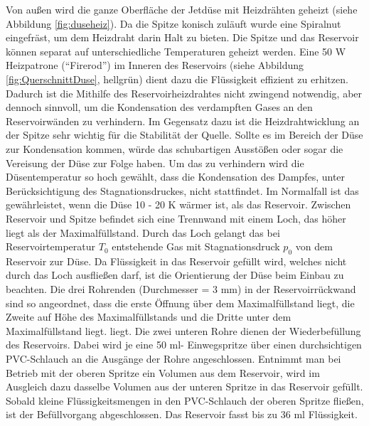 Von außen wird die ganze Oberfläche der Jetdüse mit Heizdrähten geheizt \linebreak (siehe Abbildung \ref{fig:duseheiz}). Da die Spitze konisch zuläuft wurde eine Spiralnut eingefräst, um dem Heizdraht darin Halt zu bieten. Die Spitze und das Reservoir können separat auf unterschiedliche Temperaturen geheizt werden. Eine 50 W Heizpatrone \linebreak (\enquote{Firerod}) im Inneren des Reservoirs (siehe Abbildung \ref{fig:QuerschnittDuse}, hellgrün) dient dazu die Flüssigkeit effizient zu erhitzen. Dadurch ist die Mithilfe des Reservoirheizdrahtes nicht zwingend notwendig, aber dennoch sinnvoll, um die Kondensation des verdampften Gases an den Reservoirwänden zu verhindern. Im Gegensatz dazu ist die Heizdrahtwicklung an der Spitze sehr wichtig für die Stabilität der Quelle. Sollte es im Bereich der Düse zur Kondensation kommen, würde das schubartigen Ausstößen oder sogar die Vereisung der Düse zur Folge haben. Um das zu verhindern wird die Düsentemperatur so hoch gewählt, dass die Kondensation des Dampfes, unter Berücksichtigung des Stagnationsdruckes, nicht stattfindet. Im Normalfall ist das gewährleistet, wenn die Düse 10 - 20 K wärmer ist, als das Reservoir.
Zwischen Reservoir und Spitze befindet sich eine Trennwand mit einem Loch, das höher liegt als der Maximalfüllstand. Durch das Loch gelangt das bei Reservoirtemperatur $T_0$ entstehende Gas mit Stagnationsdruck $p_0$ von dem Reservoir zur Düse. 
Da Flüssigkeit in das Reservoir gefüllt wird, welches nicht durch das Loch ausfließen darf, ist die Orientierung der Düse beim Einbau zu beachten. Die drei Rohrenden \linebreak (Durchmesser = 3 mm) in der Reservoirrückwand sind so angeordnet, dass die erste Öffnung über dem Maximalfüllstand liegt, die Zweite auf Höhe des Maximalfüllstands und die Dritte unter dem Maximalfüllstand liegt. liegt. Die zwei unteren Rohre dienen der Wiederbefüllung des Reservoirs. Dabei wird je eine 50 ml- Einwegspritze über einen durchsichtigen PVC-Schlauch an die Ausgänge der Rohre angeschlossen. Entnimmt man bei Betrieb mit der oberen Spritze ein Volumen aus dem Reservoir, wird im Ausgleich dazu dasselbe Volumen aus der unteren Spritze in das Reservoir gefüllt. Sobald kleine Flüssigkeitsmengen in den PVC-Schlauch der oberen Spritze fließen, ist der Befüllvorgang abgeschlossen. Das Reservoir fasst bis zu 36 ml Flüssigkeit. 
